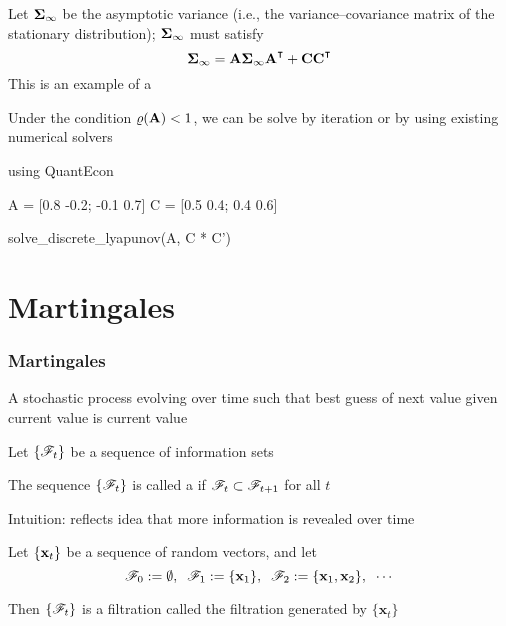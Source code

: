 \begin{frame}[fragile]
        
    \vspace{2em}
    Let ${\boldsymbol \Sigma}_\infty$ be 
    the asymptotic variance (i.e., the variance--covariance matrix of the
    stationary distribution); ${\boldsymbol \Sigma}_\infty$ must satisfy
    \begin{equation*}
        \boldSigma_\infty = \boldA \boldSigma_\infty \boldA^\T + \boldC \boldC^\T
    \end{equation*}
    This is an example of a 

    Under the condition
    $\varrho(\mathbf A) < 1$, we can be solve by iteration or by using existing
    numerical solvers
    
    \small \begin{juliacode}
using QuantEcon

A = [0.8 -0.2; 
    -0.1 0.7]
C = [0.5 0.4;
     0.4 0.6]

solve_discrete_lyapunov(A, C * C')
    \end{juliacode}

\end{frame}

\section{Martingales}

\begin{frame}\frametitle{Martingales}
    
    \vspace{2em}
    A stochastic process evolving over time such that best guess of 
    next value given current value is current value

    \vspace{1em}
    Let $\{\mathscr F_t\}$ be a sequence of information sets

    The sequence $\{\mathscr F_t\}$ is called a  if $\mathscr F_t \subset
    \mathscr F_{t+1}$ for all $t$

    \vspace{1em}
    Intuition: reflects idea that more information is revealed over time
    
\end{frame}
    
\begin{frame}

    \vspace{2em}
    \Eg Let $\{{\mathbf x}_t\}$ be a sequence of random vectors, and let
        \begin{equation*}
            \mathscr F_0 := \emptyset, \; \;
            \mathscr F_1 := \{{\mathbf x}_1\}, \; \;
            \mathscr F_2 := \{{\mathbf x}_1, {\mathbf x}_2\}, \; \;
            \cdots
        \end{equation*}
    
    Then $\{\mathscr F_t\}$ is a filtration called the filtration generated by $\{\textbf{x}_{t}\}$
    
\end{frame}



